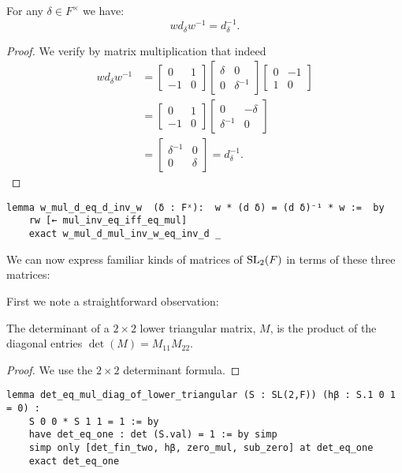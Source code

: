 \begin{lemma}
\label{SpecialMatrices.w_mul_d_eq_d_inv_w}
\leanok
For any $\delta \in F^\times$ we have:
\[ 
w d_\delta w^{-1} = d^{-1}_\delta.
\]
\end{lemma}
\begin{proof} 
\leanok
We verify by matrix multiplication that indeed
\begin{align*}
w d_\delta w^{-1} &= \begin{bmatrix} 0 & 1 \\ - 1 & 0 \end{bmatrix} \begin{bmatrix} \delta & 0 \\ 0 & \delta^{-1} \end{bmatrix} \begin{bmatrix} 0 & - 1 \\ 1 & 0 \end{bmatrix}\\
&=  \begin{bmatrix} 0 & 1 \\ - 1 & 0 \end{bmatrix} \begin{bmatrix} 0 & - \delta \\ \delta^{-1} & 0 \end{bmatrix}\\
&= \! \begin{bmatrix} \delta^{-1} & 0 \\ 0 & \delta \end{bmatrix} \!= d^{-1}_\delta. 
\end{align*}
\end{proof}
\begin{footnotesize}
\begin{verbatim}
lemma w_mul_d_eq_d_inv_w  (δ : Fˣ):  w * (d δ) = (d δ)⁻¹ * w :=  by
    rw [← mul_inv_eq_iff_eq_mul]
    exact w_mul_d_mul_inv_w_eq_inv_d _
\end{verbatim}
\end{footnotesize}

We can now express familiar kinds of matrices of $\operatorname{SL}_2(F)$ in terms of these three matrices:

First we note a straightforward observation:
\begin{corollary}
    \label{det_eq_mul_diag_of_lower_triangular}
    \leanok
    The determinant of a $2 \times 2$ lower triangular matrix, $M$, is the product of the diagonal entries $\det(M) = M_{11} M_{22}$.
\end{corollary}
\begin{proof}
\leanok
We use the $2 \times 2$ determinant formula.
\end{proof}
\begin{footnotesize}
\begin{verbatim}
lemma det_eq_mul_diag_of_lower_triangular (S : SL(2,F)) (hβ : S.1 0 1 = 0) :
    S 0 0 * S 1 1 = 1 := by
    have det_eq_one : det (S.val) = 1 := by simp
    simp only [det_fin_two, hβ, zero_mul, sub_zero] at det_eq_one
    exact det_eq_one
\end{verbatim}
\end{footnotesize}

